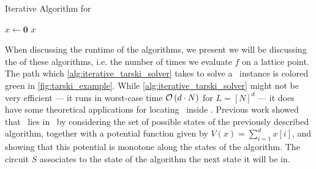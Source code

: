 \begin{algorithm}
	\caption{Iterative Algorithm for \Tarski}
	\label{alg:iterative_tarski_solver}
	$x \leftarrow \mathbf{0}$ \;
	\Return $x$ \;
\end{algorithm}

When discussing the runtime of the algorithms, we present we will be discussing the  of these algorithms, i.e. the number of times we evaluate $f$ on a lattice point. The path which \cref{alg:iterative_tarski_solver} takes to solve a \Tarski\ instance is colored green in \cref{fig:tarski_example}. While \cref{alg:iterative_tarski_solver} might not be very efficient --- it runs in worst-case time $\mathcal{O}\left(d \cdot N\right)$ for $L = [N]^d$ --- it does have some theoretical applications for locating \Tarski\ inside \TFNP. Previous work  showed that \Tarski\ lies in \PLS\ by considering the set of possible states of the previously described algorithm, together with a potential function given by $V(x) = \sum_{i=1}^{d}{x[i]}$, and showing that this potential is monotone along the states of the algorithm. The circuit $S$ associates to the state of the algorithm the next state it will be in.

